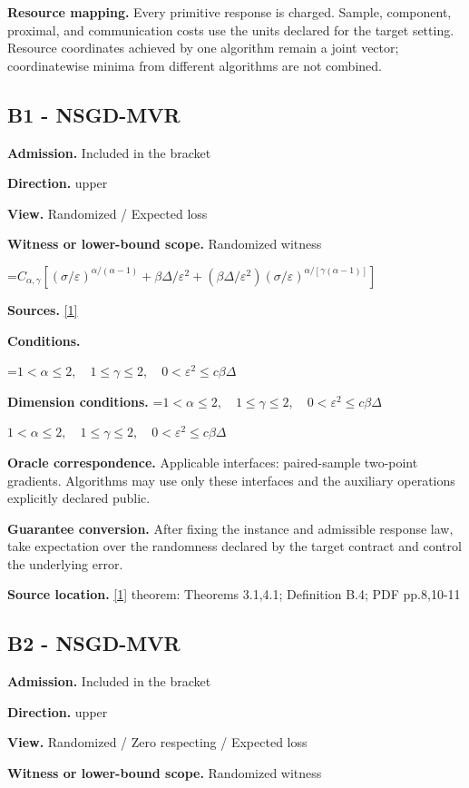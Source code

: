 \documentclass[10pt,a4paper]{article}
\newcommand{\AtlasMath}[1]{\par\begingroup\centering\setbox0=\hbox{$\displaystyle #1$}\ifdim\wd0>1.4\linewidth\typeout{ATLAS WIDE FORMULA: \the\wd0}\fi\ifdim\wd0>\linewidth\resizebox{\linewidth}{!}{\box0}\else\box0\fi\par\endgroup}
\newcommand{\AtlasInlineMath}[1]{\begingroup\setbox0=\hbox{$#1$}\ifdim\wd0>.4\linewidth\endgroup\AtlasMath{#1}\else\endgroup$#1$\fi}
\begin{document}
\textbf{Resource mapping.} Every primitive response is charged. Sample, component, proximal, and communication costs use the units declared for the target setting. Resource coordinates achieved by one algorithm remain a joint vector; coordinatewise minima from different algorithms are not combined.

\subsection{B1 - NSGD-MVR}
\textbf{Admission.} Included in the bracket

\textbf{Direction.} upper

\textbf{View.} Randomized / Expected loss

\textbf{Witness or lower-bound scope.} Randomized witness

\AtlasMath{C_{\alpha,\gamma}[(\sigma/\varepsilon)^{\alpha/(\alpha-1)}+\beta\Delta/\varepsilon^2+(\beta\Delta/\varepsilon^2)(\sigma/\varepsilon)^{\alpha/[\gamma(\alpha-1)]}]}
\textbf{Sources.} \href{https://arxiv.org/pdf/2512.18713}{[1]}

\textbf{Conditions.} 
\AtlasMath{1<\alpha\le2,\quad1\le\gamma\le2,\quad0<\varepsilon^2\le c\beta\Delta}


\textbf{Dimension conditions.} \AtlasInlineMath{1<\alpha\le2,\quad1\le\gamma\le2,\quad0<\varepsilon^2\le c\beta\Delta}

\textbf{Oracle correspondence.} Applicable interfaces: paired-sample two-point gradients. Algorithms may use only these interfaces and the auxiliary operations explicitly declared public.

\textbf{Guarantee conversion.} After fixing the instance and admissible response law, take expectation over the randomness declared by the target contract and control the underlying error.

\textbf{Source location.} \href{https://arxiv.org/pdf/2512.18713}{[1]} theorem: Theorems 3.1,4.1; Definition B.4; PDF pp.8,10-11

\subsection{B2 - NSGD-MVR}
\textbf{Admission.} Included in the bracket

\textbf{Direction.} upper

\textbf{View.} Randomized / Zero respecting / Expected loss

\textbf{Witness or lower-bound scope.} Randomized witness
\end{document}

